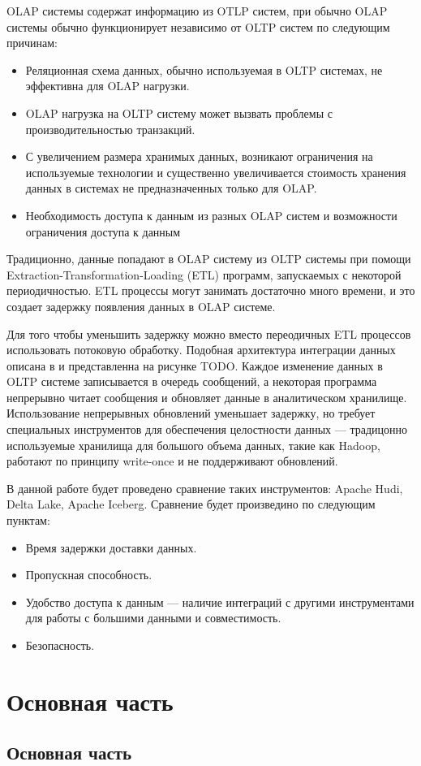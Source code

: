 \documentclass[%
bachelor,    %
subf,        %
href,        %
colorlinks,  %
]{disser}
\begin{document}
OLAP системы содержат информацию из OTLP систем, при обычно OLAP системы обычно функционирует независимо от OLTP систем по следующим причинам: \cite{oltp_olap}
\begin{itemize}
	\item Реляционная схема данных, обычно используемая в OLTP системах, не эффективна для OLAP нагрузки.
	\item OLAP нагрузка на OLTP систему может вызвать проблемы с производительностью транзакций.
	\item С увеличением размера хранимых данных, возникают ограничения на используемые технологии и существенно увеличивается стоимость хранения данных в системах не предназначенных только для OLAP.
	\item Необходимость доступа к данным из разных OLAP систем и возможности ограничения доступа к данным
\end{itemize}

Традиционно, данные попадают в OLAP систему из OLTP системы при помощи Extraction-Transformation-Loading (ETL) программ,
запускаемых с некоторой периодичностью. ETL процессы могут занимать достаточно много времени, и это создает задержку появления данных в OLAP системе. 

Для того чтобы уменьшить задержку можно вместо переодичных ETL процессов использовать потоковую обработку.
Подобная архитектура интеграции данных описана в \cite{streaming_integration} и представленна на рисунке TODO.
Каждое изменение данных в OLTP системе записывается в очередь сообщений, а некоторая программа непрерывно читает сообщения и обновляет данные в аналитическом хранилище.
Использование непрерывных обновлений уменьшает задержку, но требует специальных инструментов для обеспечения целостности данных --- традицонно используемые хранилища для большого объема данных, такие как Hadoop, работают по принципу write-once и не поддерживают обновлений. 

В данной работе будет проведено сравнение таких инструментов: Apache Hudi, Delta Lake, Apache Iceberg.
Сравнение будет произведино по следующим пунктам:
\begin{itemize}
	\item Время задержки доставки данных.
	\item Пропускная способность.
	\item Удобство доступа к данным --- наличие интеграций с другими инструментами для работы с большими данными и совместимость.
	\item Безопасность.
\end{itemize}
\section{Основная часть}

\cite{test_data}

\subsection{Основная часть}




\printbibliography[heading=bibintoc]

\appendix
\end{document}
